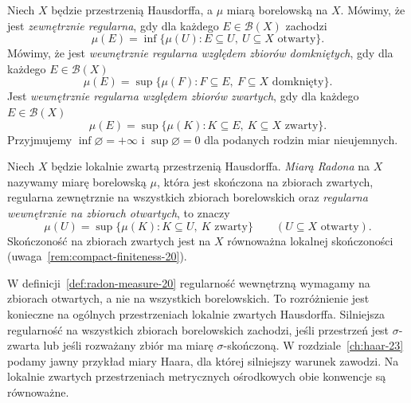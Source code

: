 \begin{definicja}
\label{def:regularity-20}
Niech $X$ będzie przestrzenią Hausdorffa, a $\mu$ miarą
borelowską na $X$. Mówimy, że jest
\emph{zewnętrznie regularna}, gdy dla każdego
$E\in\mathcal B(X)$ zachodzi
\begin{equation}\label{eq:outer-regular-20}
 \mu(E)=\inf\{\mu(U):E\subseteq U,\ U\subseteq X
 \text{ otwarty}\}.
\end{equation}
Mówimy, że jest \emph{wewnętrznie regularna względem
zbiorów domkniętych}, gdy dla każdego $E\in\mathcal B(X)$
\[
 \mu(E)=\sup\{\mu(F):F\subseteq E,\ F\subseteq X
 \text{ domknięty}\}.
\]
Jest \emph{wewnętrznie regularna względem zbiorów zwartych},
gdy dla każdego $E\in\mathcal B(X)$
\begin{equation}\label{eq:inner-compact-20}
 \mu(E)=\sup\{\mu(K):K\subseteq E,\ K\subseteq X
 \text{ zwarty}\}.
\end{equation}
Przyjmujemy $\inf\varnothing=+\infty$ i
$\sup\varnothing=0$ dla podanych rodzin miar nieujemnych.
\end{definicja}

\begin{definicja}
\label{def:radon-measure-20}
Niech $X$ będzie lokalnie zwartą przestrzenią Hausdorffa.
\emph{Miarą Radona} na $X$ nazywamy miarę borelowską $\mu$,
która jest skończona na zbiorach zwartych, regularna
zewnętrznie na wszystkich zbiorach borelowskich oraz
\emph{regularna wewnętrznie na zbiorach otwartych}, to znaczy
\[
 \mu(U)=\sup\{\mu(K): K\subseteq U,\ K\text{ zwarty}\}
 \qquad(U\subseteq X\text{ otwarty}).
\]
Skończoność na zbiorach zwartych jest na $X$ równoważna
lokalnej skończoności (uwaga~\ref{rem:compact-finiteness-20}).
\end{definicja}

\begin{uwaga}
W definicji~\ref{def:radon-measure-20} regularność
wewnętrzną wymagamy na zbiorach otwartych, a nie na wszystkich
borelowskich. To rozróżnienie jest konieczne na ogólnych
przestrzeniach lokalnie zwartych Hausdorffa. Silniejsza
regularność na wszystkich zbiorach borelowskich zachodzi,
jeśli przestrzeń jest $\sigma$-zwarta lub jeśli rozważany
zbiór ma miarę $\sigma$-skończoną.
W rozdziale~\ref{ch:haar-23} podamy jawny przykład
miary Haara, dla której silniejszy warunek zawodzi.
Na lokalnie zwartych przestrzeniach metrycznych ośrodkowych
obie konwencje są równoważne.
\end{uwaga}

